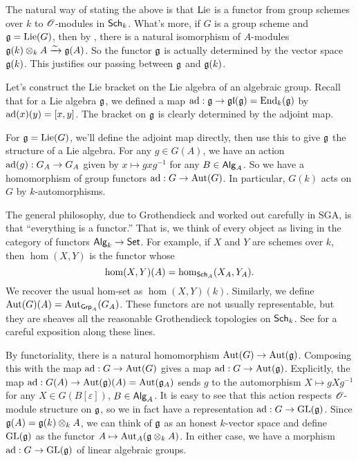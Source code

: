\begin{hard}
The natural way of stating the above is that $\operatorname{Lie}$ is a functor from group 
schemes over $k$ to $\mathscr{O}$-modules in $\mathsf{Sch}_{k}$. What's more, if $G$ is a 
group scheme and $\mathfrak{g}=\operatorname{Lie}(G)$, then by \cite[II 3.3]{sga3-i}, 
there is a natural isomorphism of $A$-modules 
$\mathfrak{g}(k)\otimes_k A\xrightarrow\sim \mathfrak{g}(A)$. So the functor $\mathfrak{g}$ is actually determined 
by the vector space $\mathfrak{g}(k)$. This justifies our passing between 
$\mathfrak{g}$ and $\mathfrak{g}(k)$. 
\end{hard}

Let's construct the Lie bracket on the Lie algebra of an algebraic group. 
Recall that for a Lie algebra $\mathfrak{g}$, we defined a map 
$\operatorname{ad}:\mathfrak{g}\to \mathfrak{gl}(\mathfrak{g}) = \operatorname{End}_k(\mathfrak{g})$ by $\operatorname{ad}(x)(y)=[x,y]$. The 
bracket on $\mathfrak{g}$ is clearly determined by the adjoint map. 

For $\mathfrak{g}=\operatorname{Lie}(G)$, we'll define the adjoint map directly, then use this to 
give $\mathfrak{g}$ the structure of a Lie algebra. For any $g\in G(A)$, we have an 
action $\operatorname{ad}(g):G_A\to G_A$ given by $x\mapsto g x g^{-1}$ for any 
$B\in \mathsf{Alg}_{A}$. So we have a homomorphism of group functors 
$\operatorname{ad}:G\to \operatorname{Aut}(G)$. In particular, $G(k)$ acts on $G$ by 
$k$-automorphisms. 

\begin{hard}
The general philosophy, due to Grothendieck and worked out carefully in 
SGA, is that ``everything is a functor.'' That is, we think of every object 
as living in the category of functors $\mathsf{Alg}_{k}\to \mathsf{Set}$. For example, 
if $X$ and $Y$ are schemes over $k$, then $\hom(X,Y)$ is the functor whose 
\[
  \hom(X,Y)(A) = \hom_{\mathsf{Sch}_{A}}(X_A, Y_A) .
\]
We recover the usual hom-set as $\hom(X,Y)(k)$. Similarly, we define 
$\operatorname{Aut}(G)(A)=\operatorname{Aut}_{\mathsf{Grp}_A}(G_A)$. These functors are not 
usually representable, but they are sheaves all the reasonable Grothendieck 
topologies on $\mathsf{Sch}_{k}$. See \cite[I \S 1--3, II \S 1]{sga3-i} for a careful 
exposition along these lines. 
\end{hard}

By functoriality, there is a natural homomorphism 
$\operatorname{Aut}(G)\to \operatorname{Aut}(\mathfrak{g})$. Composing this with the map 
$\operatorname{ad}:G\to \operatorname{Aut}(G)$ gives a map 
$\operatorname{ad}:G\to \operatorname{Aut}(\mathfrak{g})$. Explicitly, the map 
$\operatorname{ad}:G(A)\to \operatorname{Aut}(\mathfrak{g})(A)=\operatorname{Aut}(\mathfrak{g}_A)$ sends 
$g$ to the automorphism $X\mapsto g X g^{-1}$ for any 
$X\in G(B[\varepsilon])$, $B\in \mathsf{Alg}_{A}$. It is easy to see that this 
action respects $\mathscr{O}$-module structure on $\mathfrak{g}$, so we in fact have a 
representation $\operatorname{ad}:G\to \operatorname{GL}(\mathfrak{g})$. Since 
$\mathfrak{g}(A)=\mathfrak{g}(k)\otimes_k A$, we can think of $\mathfrak{g}$ as an honest 
$k$-vector space and define $\operatorname{GL}(\mathfrak{g})$ as the functor 
$A\mapsto \operatorname{Aut}_A(\mathfrak{g}\otimes_k A)$. In either case, we have a 
morphism $\operatorname{ad}:G\to \operatorname{GL}(\mathfrak{g})$ of linear algebraic groups. 


